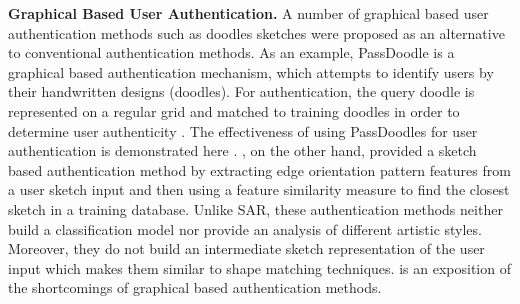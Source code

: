 \noindent\textbf{Graphical Based User Authentication.}
A number of graphical based user authentication methods such as doodles sketches were proposed as an alternative to conventional authentication methods. As an example, PassDoodle is a graphical based authentication mechanism, which attempts to identify users by their handwritten designs (doodles). For authentication, the query doodle is represented on a regular grid and matched to training doodles in order to determine user authenticity \cite{varenhorst2004passdoodles,Govindarajulu:2007:PMU:1322192.1322233}. The effectiveness of using PassDoodles for user authentication is demonstrated here . , on the other hand, provided a sketch based authentication method by extracting edge orientation pattern features from a user sketch input and then using a feature similarity measure to find the closest sketch in a training database. Unlike SAR, these authentication methods neither build a classification model nor provide an analysis of different artistic styles. Moreover, they do not build an intermediate sketch representation of the user input which makes them similar to shape matching techniques. \cite{gani2010new} is an exposition of the shortcomings of graphical based authentication methods.





